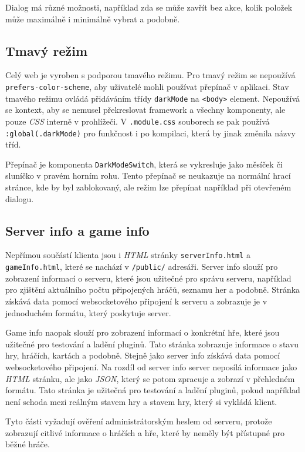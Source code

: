 Dialog má různé možnosti, například zda se může zavřít bez akce, kolik položek může maximálně i minimálně vybrat a podobně.

\subsection{Tmavý režim}
Celý web je vyroben s podporou tmavého režimu. Pro tmavý režim se nepoužívá \texttt{prefers-color-scheme}, aby uživatelé mohli používat přepínač v aplikaci. Stav tmavého režimu ovládá přidáváním třídy \texttt{darkMode} na \texttt{<body>} element. Nepoužívá se kontext, aby se nemusel překreslovat framework a všechny komponenty, ale pouze \emph{CSS} interně v prohlížeči. V \texttt{.module.css} souborech se pak používá \texttt{:global(.darkMode)} pro funkčnost i po kompilaci, která by jinak změnila názvy tříd.

Přepínač je komponenta \texttt{DarkModeSwitch}, která se vykresluje jako měsíček či sluníčko v pravém horním rohu. Tento přepínač se neukazuje na normální hrací stránce, kde by byl zablokovaný, ale režim lze přepínat například při otevřeném dialogu.

\subsection{Server info a game info}
Nepřímou součástí klienta jsou i \emph{HTML} stránky \texttt{serverInfo.html} a \texttt{gameInfo.html}, které se nachází v \texttt{/public/} adresáři. Server info slouží pro zobrazení informací o serveru, které jsou užitečné pro správu serveru, například pro zjištění aktuálního počtu připojených hráčů, seznamu her a podobně. Stránka získává data pomocí websocketového připojení k serveru a zobrazuje je v jednoduchém formátu, který poskytuje server.

Game info naopak slouží pro zobrazení informací o konkrétní hře, které jsou užitečné pro testování a ladění pluginů. Tato stránka zobrazuje informace o stavu hry, hráčích, kartách a podobně. Stejně jako server info získává data pomocí websocketového připojení. Na rozdíl od server info server neposílá informace jako \emph{HTML} stránku, ale jako \emph{JSON}, který se potom zpracuje a zobrazí v přehledném formátu. Tato stránka je užitečná pro testování a ladění pluginů, pokud například není schoda mezi reálným stavem hry a stavem hry, který si vykládá klient.

Tyto části vyžadují ověření administrátorským heslem od serveru, protože zobrazují citlivé informace o hráčích a hře, které by neměly být přístupné pro běžné hráče.

